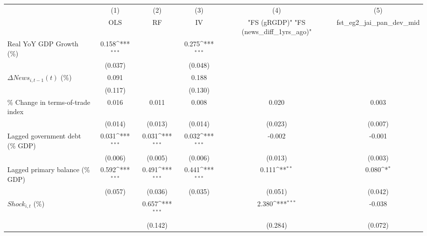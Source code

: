 {
\def\sym#1{\ifmmode^{#1}\else\(^{#1}\)\fi}
\begin{tabular}{l*{5}{c}}
\toprule
                    &\multicolumn{1}{c}{(1)}&\multicolumn{1}{c}{(2)}&\multicolumn{1}{c}{(3)}&\multicolumn{1}{c}{(4)}&\multicolumn{1}{c}{(5)}\\
                    &\multicolumn{1}{c}{OLS}&\multicolumn{1}{c}{RF}&\multicolumn{1}{c}{IV}&\multicolumn{1}{c}{ "FS (gRGDP)"  "FS (news_diff_1yrs_ago)" }&\multicolumn{1}{c}{fst_eg2_jai_pan_dev_mid}\\
\midrule
Real YoY GDP Growth (\%)&       0.158\sym{***}&                     &       0.275\sym{***}&                     &                     \\
                    &     (0.037)         &                     &     (0.048)         &                     &                     \\
\addlinespace
$ \Delta News_{i,t-1}(t)$ (\%)&       0.091         &                     &       0.188         &                     &                     \\
                    &     (0.117)         &                     &     (0.130)         &                     &                     \\
\addlinespace
\% Change in terms-of-trade index&       0.016         &       0.011         &       0.008         &       0.020         &       0.003         \\
                    &     (0.014)         &     (0.013)         &     (0.014)         &     (0.023)         &     (0.007)         \\
\addlinespace
Lagged government debt (\% GDP)&       0.031\sym{***}&       0.031\sym{***}&       0.032\sym{***}&      -0.002         &      -0.001         \\
                    &     (0.006)         &     (0.005)         &     (0.006)         &     (0.013)         &     (0.003)         \\
\addlinespace
Lagged primary balance (\% GDP)&       0.592\sym{***}&       0.491\sym{***}&       0.441\sym{***}&       0.111\sym{**} &       0.080\sym{*}  \\
                    &     (0.057)         &     (0.036)         &     (0.035)         &     (0.051)         &     (0.042)         \\
\addlinespace
$ Shock_{i,t}$ (\%) &                     &       0.657\sym{***}&                     &       2.380\sym{***}&      -0.038         \\
                    &                     &     (0.142)         &                     &     (0.284)         &     (0.072)         \\

\end{tabular}}
